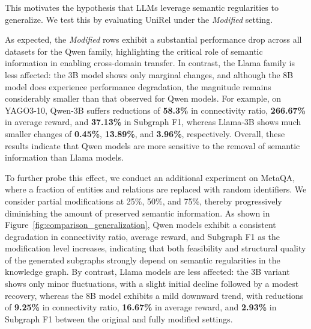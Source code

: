 
This motivates the hypothesis that LLMs leverage semantic regularities to generalize.
We test this by evaluating UniRel under the \emph{Modified} setting.

As expected, the \emph{Modified} rows exhibit a substantial performance drop across all datasets for the Qwen family, highlighting the critical role of semantic information in enabling cross-domain transfer.
In contrast, the Llama family is less affected: the 3B model shows only marginal changes, and although the 8B model does experience performance degradation, the magnitude remains considerably smaller than that observed for Qwen models.
For example, on YAGO3-10, Qwen-3B suffers reductions of \textbf{58.3\%} in connectivity ratio, \textbf{266.67\%} in average reward, and \textbf{37.13\%} in Subgraph F1, whereas Llama-3B shows much smaller changes of \textbf{0.45\%}, \textbf{13.89\%}, and \textbf{3.96\%}, respectively.
Overall, these results indicate that Qwen models are more sensitive to the removal of semantic information than Llama models.


To further probe this effect, we conduct an additional experiment on MetaQA, where a fraction of entities and relations are replaced with random identifiers.
We consider partial modifications at 25\%, 50\%, and 75\%, thereby progressively diminishing the amount of preserved semantic information.
As shown in Figure~\ref{fig:comparison_generalization}, Qwen models exhibit a consistent degradation in connectivity ratio, average reward, and Subgraph F1 as the modification level increases, indicating that both feasibility and structural quality of the generated subgraphs strongly depend on semantic regularities in the knowledge graph.
By contrast, Llama models are less affected: the 3B variant shows only minor fluctuations, with a slight initial decline followed by a modest recovery, whereas the 8B model exhibits a mild downward trend, with reductions of \textbf{9.25\%} in connectivity ratio, \textbf{16.67\%} in average reward, and \textbf{2.93\%} in Subgraph F1 between the original and fully modified settings.

